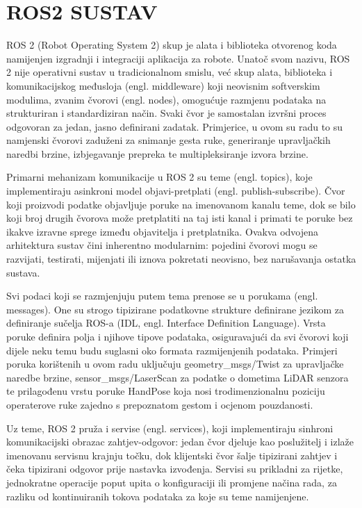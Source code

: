 \documentclass[12pt,a4paper,oneside]{report}
\begin{document}
\chapter{ROS2 SUSTAV}
ROS 2 (Robot Operating System 2) skup je alata i biblioteka otvorenog koda namijenjen izgradnji i 
integraciji aplikacija za robote. Unatoč svom nazivu, ROS 2 nije operativni sustav u tradicionalnom smislu, 
već skup alata, biblioteka i komunikacijskog međusloja (engl. middleware) koji neovisnim softverskim modulima, zvanim čvorovi 
(engl. nodes), omogućuje razmjenu podataka na strukturiran i standardiziran način. Svaki čvor je samostalan 
izvršni proces odgovoran za jedan, jasno definirani zadatak. Primjerice, u ovom su radu to su namjenski čvorovi 
zaduženi za snimanje gesta ruke, generiranje upravljačkih naredbi brzine, izbjegavanje prepreka te 
multipleksiranje izvora brzine. 

Primarni mehanizam komunikacije u ROS 2 su teme (engl. topics), koje 
implementiraju asinkroni model objavi-pretplati (engl. publish-subscribe). Čvor koji proizvodi podatke 
objavljuje poruke na imenovanom kanalu teme, dok se bilo koji broj drugih čvorova može pretplatiti na taj 
isti kanal i primati te poruke bez ikakve izravne sprege između objavitelja i pretplatnika. Ovakva odvojena 
arhitektura sustav čini inherentno modularnim: pojedini čvorovi mogu se razvijati, testirati, mijenjati ili 
iznova pokretati neovisno, bez narušavanja ostatka sustava. 

Svi podaci koji se razmjenjuju putem tema 
prenose se u porukama (engl. messages). One su strogo tipizirane podatkovne strukture definirane jezikom za 
definiranje sučelja ROS-a (IDL, engl. Interface Definition Language). Vrsta poruke definira polja i njihove 
tipove podataka, osiguravajući da svi čvorovi koji dijele neku temu budu suglasni oko formata razmijenjenih 
podataka. Primjeri poruka korištenih u ovom radu uključuju geometry\_msgs/Twist za upravljačke naredbe brzine, 
sensor\_msgs/LaserScan za podatke o dometima LiDAR senzora te prilagođenu vrstu poruke HandPose koja nosi 
trodimenzionalnu poziciju operaterove ruke zajedno s prepoznatom gestom i ocjenom pouzdanosti. 

Uz teme, ROS 2 pruža i servise (engl. services), koji implementiraju sinhroni komunikacijski obrazac 
zahtjev-odgovor: jedan čvor djeluje kao poslužitelj i izlaže imenovanu servisnu krajnju točku, dok 
klijentski čvor šalje tipizirani zahtjev i čeka tipizirani odgovor prije nastavka izvođenja. Servisi su 
prikladni za rijetke, jednokratne operacije poput upita o konfiguraciji ili promjene načina rada, za razliku 
od kontinuiranih tokova podataka za koje su teme namijenjene. 
\end{document}
